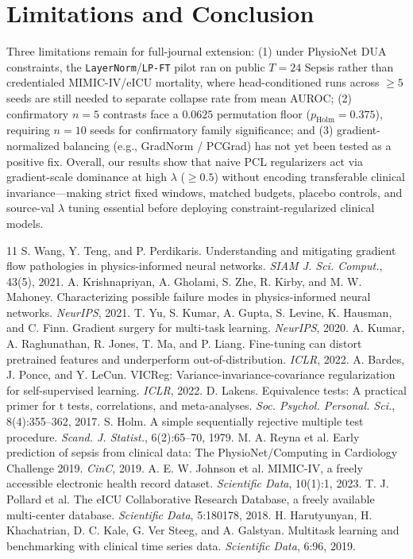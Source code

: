 \documentclass[10pt,twocolumn]{article}
\begin{document}
\section{Limitations and Conclusion}
Three limitations remain for full-journal extension: (1) under PhysioNet DUA constraints, the \texttt{LayerNorm}/\texttt{LP-FT} pilot ran on public $T=24$ Sepsis rather than credentialed MIMIC-IV/eICU mortality, where head-conditioned runs across $\ge 5$ seeds are still needed to separate collapse rate from mean AUROC; (2) confirmatory $n=5$ contrasts face a $0.0625$ permutation floor ($p_{\mathrm{Holm}}=0.375$), requiring $n=10$ seeds for confirmatory family significance; and (3) gradient-normalized balancing (e.g., GradNorm / PCGrad) has not yet been tested as a positive fix. Overall, our results show that naive PCL regularizers act via gradient-scale dominance at high $\lambda$ ($\ge 0.5$) without encoding transferable clinical invariance—making strict fixed windows, matched budgets, placebo controls, and source-val $\lambda$ tuning essential before deploying constraint-regularized clinical models.


\begin{thebibliography}{11}
\scriptsize
{} S. Wang, Y. Teng, and P. Perdikaris. Understanding and mitigating gradient flow pathologies in physics-informed neural networks. \emph{SIAM J. Sci. Comput.}, 43(5), 2021.
 A. Krishnapriyan, A. Gholami, S. Zhe, R. Kirby, and M. W. Mahoney. Characterizing possible failure modes in physics-informed neural networks. \emph{NeurIPS}, 2021.
 T. Yu, S. Kumar, A. Gupta, S. Levine, K. Hausman, and C. Finn. Gradient surgery for multi-task learning. \emph{NeurIPS}, 2020.
 A. Kumar, A. Raghunathan, R. Jones, T. Ma, and P. Liang. Fine-tuning can distort pretrained features and underperform out-of-distribution. \emph{ICLR}, 2022.
 A. Bardes, J. Ponce, and Y. LeCun. VICReg: Variance-invariance-covariance regularization for self-supervised learning. \emph{ICLR}, 2022.
 D. Lakens. Equivalence tests: A practical primer for t tests, correlations, and meta-analyses. \emph{Soc. Psychol. Personal. Sci.}, 8(4):355--362, 2017.
 S. Holm. A simple sequentially rejective multiple test procedure. \emph{Scand. J. Statist.}, 6(2):65--70, 1979.
 M. A. Reyna et al. Early prediction of sepsis from clinical data: The PhysioNet/Computing in Cardiology Challenge 2019. \emph{CinC}, 2019.
 A. E. W. Johnson et al. MIMIC-IV, a freely accessible electronic health record dataset. \emph{Scientific Data}, 10(1):1, 2023.
 T. J. Pollard et al. The eICU Collaborative Research Database, a freely available multi-center database. \emph{Scientific Data}, 5:180178, 2018.
 H. Harutyunyan, H. Khachatrian, D. C. Kale, G. Ver Steeg, and A. Galstyan. Multitask learning and benchmarking with clinical time series data. \emph{Scientific Data}, 6:96, 2019.
\end{thebibliography}
\end{document}
